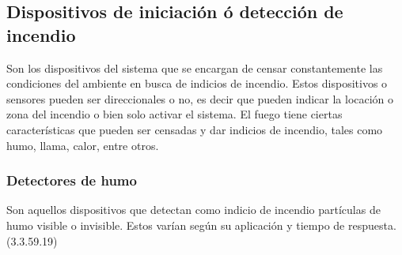 \subsection{Dispositivos de iniciación ó detección de incendio}


Son los dispositivos del sistema que se encargan de censar constantemente las condiciones del ambiente en busca de indicios de incendio. Estos dispositivos o sensores pueden ser direccionales o no, es decir que pueden indicar la locación o zona del incendio o bien solo activar el sistema. El fuego tiene ciertas características que pueden ser censadas y dar indicios de incendio, tales como humo, llama, calor, entre otros. 


\subsubsection{Detectores de humo}

Son aquellos dispositivos que detectan como indicio de incendio partículas de humo visible o invisible. Estos varían según su aplicación y tiempo de respuesta. (3.3.59.19)

